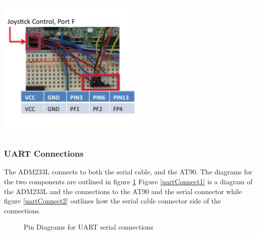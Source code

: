 \begin{minipage}{6.5in}
  \centering
    \includegraphics[width=70mm]{imageSources/joystickConnect.png}
  
  \label{joystickConnect}
\end{minipage}
\vspace{0.1in}

\subsubsection{UART Connections}


The ADM233L connects to both the serial cable, and the AT90. The diagrams for the two components are outlined in figure \ref{Uart1} Figure \ref{uartConnect1} is a diagram of the ADM233L and the connections to the AT90 and the serial connector while figure \ref{uartConnect2} outlines how the serial cable connector side of the connections. 
 
\begin{figure}[htp]
  \begin{center}
  \end{center}
 \caption{Pin Diagrams for UART serial connections}
 \label{Uart1}
\end{figure}


